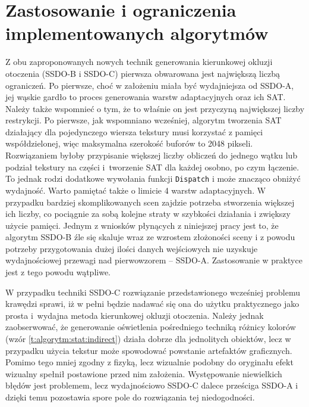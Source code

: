 	\section{Zastosowanie i ograniczenia implementowanych algorytmów}
	\label{t:wnioski:zastosowanie}
	
	
	
	Z obu zaproponowanych nowych technik generowania kierunkowej okluzji otoczenia (SSDO-B i SSDO-C) pierwsza obwarowana jest największą liczbą ograniczeń. Po pierwsze, choć w założeniu miała być wydajniejsza od SSDO-A, jej wąskie gardło to proces generowania warstw adaptacyjnych oraz ich SAT. Należy także wspomnieć o tym, że to właśnie on jest przyczyną największej liczby restrykcji. Po pierwsze, jak wspomniano wcześniej, algorytm tworzenia SAT działający dla pojedynczego wiersza tekstury musi korzystać z pamięci współdzielonej, więc maksymalna szerokość buforów to 2048 pikseli. Rozwiązaniem byłoby przypisanie większej liczby obliczeń do jednego wątku lub podział tekstury na części i~tworzenie SAT dla każdej osobno, po czym łączenie. To jednak rodzi dodatkowe wywołania funkcji \texttt{Dispatch} i może znacząco obniżyć wydajność. Warto pamiętać także o limicie 4 warstw adaptacyjnych. W przypadku bardziej skomplikowanych scen zajdzie potrzeba stworzenia większej ich liczby, co pociągnie za sobą kolejne straty w szybkości działania i zwiększy użycie pamięci. Jednym z wniosków płynących z niniejszej pracy jest to, że algorytm SSDO-B źle się skaluje wraz ze wzrostem złożoności sceny i z powodu potrzeby przygotowania dużej ilości danych wejściowych nie uzyskuje wydajnościowej przewagi nad pierwowzorem -- SSDO-A. Zastosowanie w praktyce jest z tego powodu wątpliwe.
	
	W przypadku techniki SSDO-C rozwiązanie przedstawionego wcześniej problemu krawędzi sprawi, iż w pełni będzie nadawać się ona do użytku praktycznego jako prosta i~wydajna metoda kierunkowej okluzji otoczenia. Należy jednak zaobserwować, że generowanie oświetlenia pośredniego techniką różnicy kolorów (wzór \ref{t:algorytm:stat:indirect}) działa dobrze dla jednolitych obiektów, lecz w przypadku użycia tekstur może spowodować powstanie artefaktów graficznych. Pomimo tego mniej zgodny z fizyką, lecz wizualnie podobny do oryginału efekt wizualny spełnił postawione przed nim założenia. Występowanie niewielkich błędów jest problemem, lecz wydajnościowo SSDO-C dalece prześciga SSDO-A i dzięki temu pozostawia spore pole do rozwiązania tej niedogodności.
	
